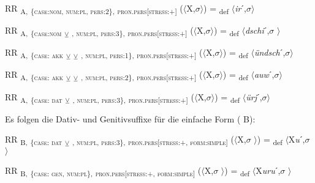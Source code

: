 \ea%
\label{ex:key:99}
 RR \textsubscript{A,} \textsubscript{\{\textsc{case:nom}, \textsc{num:pl}, \textsc{pers:2}\},} \textsubscript{\textsc{pron.pers[stress:+]}} ($\langle$X,$\sigma$$\rangle$) = \textsubscript{def} $\langle$\textit{ir}ˊ,$\sigma$$\rangle$
\z

\ea%
\label{ex:key:100}
 RR \textsubscript{A,} \textsubscript{\{\textsc{case:nom}} \textsubscript{\tiny $\veebar$}\textsubscript{ \AKK, \textsc{num:pl}, \textsc{pers:3}\},} \textsubscript{\textsc{pron.pers[stress:+]}} ($\langle$X,$\sigma$$\rangle$) = \textsubscript{def} $\langle$\textit{dschi}ˊ,$\sigma$ $\rangle$
\z

\ea%
\label{ex:key:101}
 RR \textsubscript{A,} \textsubscript{\{\textsc{case: akk}}\textsubscript{ ${\veebar}$}\textsubscript{ \DAT} \textsubscript{\tiny $\veebar$}\textsubscript{ \GEN, \textsc{num:pl}, \textsc{pers:1}\},} \textsubscript{\textsc{pron.pers[stress:+]}} ($\langle$X,$\sigma$$\rangle$) = \textsubscript{def} $\langle$\textit{ündsch}ˊ,$\sigma$$\rangle$
\z

\ea%
\label{ex:key:102}
 RR \textsubscript{A,} \textsubscript{\{\textsc{case: akk}}\textsubscript{ ${\veebar}$}\textsubscript{ \DAT} \textsubscript{\tiny $\veebar$}\textsubscript{ \GEN, \textsc{num:pl}, \textsc{pers:2}\},} \textsubscript{\textsc{pron.pers[stress:+]}} ($\langle$X,$\sigma$$\rangle$) = \textsubscript{def} $\langle$\textit{auw}ˊ,$\sigma$$\rangle$
\z

\ea%
\label{ex:key:103}
 RR \textsubscript{A,} \textsubscript{\{\textsc{case: dat}} \textsubscript{\tiny $\veebar$}\textsubscript{ \GEN, \textsc{num:pl}, \textsc{pers:3}\},} \textsubscript{\textsc{pron.pers[stress:+]}} ($\langle$X,$\sigma$$\rangle$) = \textsubscript{def} $\langle$\textit{ürj}ˊ,$\sigma$$\rangle$
\z

\noindent
Es folgen die Dativ- und Genitivsuffixe für die einfache Form ( B):

\ea%
\label{ex:key:104}
 RR \textsubscript{B,} \textsubscript{\{\textsc{case: dat}} \textsubscript{\tiny $\veebar$}\textsubscript{ \GEN, \textsc{num:pl}, \textsc{pers:3}\},} \textsubscript{\textsc{pron.pers[stress:+}, \textsc{form:simple]}} ($\langle$X,$\sigma$ $\rangle$) = \textsubscript{def} $\langle$X\textit{u}ˊ,$\sigma$ $\rangle$
\z

\ea%
\label{ex:key:105}
 RR \textsubscript{B,} \textsubscript{\{\textsc{case: gen}, \textsc{num:pl}\},} \textsubscript{\textsc{pron.pers[stress:+}, \textsc{form:simple]}} ($\langle$X,$\sigma$ $\rangle$) = \textsubscript{def} $\langle$X\textit{uru}ˊ,$\sigma$ $\rangle$
\z

